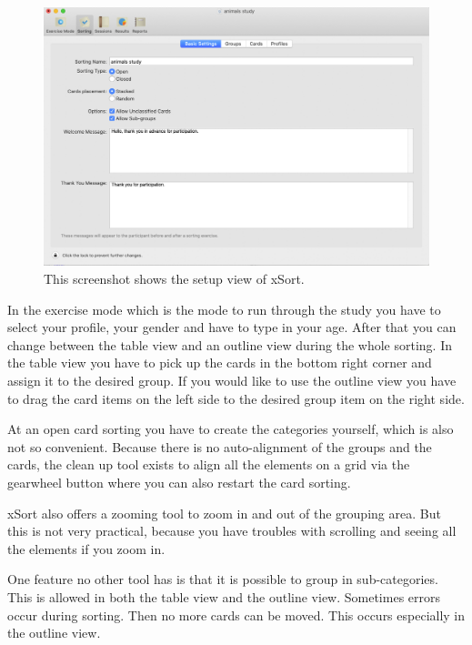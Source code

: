 \begin{figure}[tp] 
\centering
\includegraphics[keepaspectratio,width=460px]{images/xsort-setup.png}
\caption[xSort Setup] { This screenshot shows the setup view of xSort.
 }
\label{fig:xSort-setup}
\end{figure}

In the exercise mode which is the mode to run through the study you have to select your profile, 
your gender and have to type in your age. After that you can change between 
the table view and an outline view during the whole sorting. In the table view you have to pick up 
the cards in the bottom right corner and assign it to the desired group. If you would like to use the 
outline view you have to drag the card items on the left side to the desired group item on the right side. 

At an open card sorting you have to create the categories yourself, which is also not so 
convenient. Because there is no auto-alignment of the groups and the cards, the clean up 
tool exists to align all the elements on a grid via the gearwheel button where you can also restart 
the card sorting. 

xSort also offers a zooming tool to zoom in and out
of the grouping area. But this is not very practical, because you have troubles with scrolling and 
seeing all the elements if you zoom in. 

One feature no other tool has is that it is possible to group in sub-categories. This is allowed in 
both the table view and the outline view. Sometimes errors occur during sorting. Then no more 
cards can be moved. This occurs especially in the outline view.

